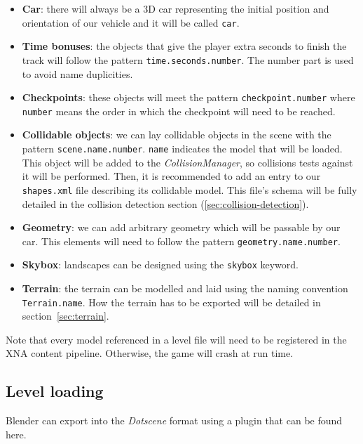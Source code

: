 \begin{itemize}
	\item \textbf{Car}: there will always be a 3D car representing the initial position
	and orientation of our vehicle and it will be called \texttt{car}.
	\item \textbf{Time bonuses}: the objects that give the player extra seconds to finish
	the track will follow the pattern \texttt{time.seconds.number}. The number part is used
	to avoid name duplicities.
	\item \textbf{Checkpoints}: these objects will meet the pattern \texttt{checkpoint.number}
	where \texttt{number} means the order in which the checkpoint will need to be reached.
	\item \textbf{Collidable objects}: we can lay collidable objects in the scene with
	the pattern \texttt{scene.name.number}. \texttt{name} indicates the model that will
	be loaded. This object will be added to the \textit{CollisionManager}, so
	collisions tests against it will be performed. Then, it is recommended
	to add an entry to our \texttt{shapes.xml} file describing its collidable model.
	This file's schema will be fully detailed in the collision detection section (\ref{sec:collision-detection}).
	\item \textbf{Geometry}: we can add arbitrary geometry which will be passable by our car.
	This elements will need to follow the pattern \texttt{geometry.name.number}.
	\item \textbf{Skybox}: landscapes can be designed using the \texttt{skybox} keyword.
	\item \textbf{Terrain}: the terrain can be modelled and laid using the naming convention
	\texttt{Terrain.name}. How the terrain has to be exported will be detailed in 
	section~\ref{sec:terrain}.
\end{itemize}

Note that every model referenced in a level file will need to be registered in the
XNA content pipeline. Otherwise, the game will crash at run time.


\subsection{Level loading}

Blender can export into the \textit{Dotscene} format using a plugin that can be found here.\\

